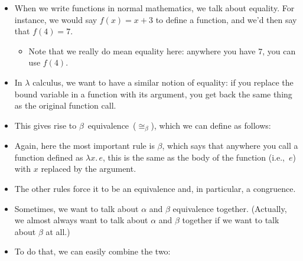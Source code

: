 \documentclass{lecturenotes}
\newcommand{\abs}[2]{\ensuremath{\lambda #1.\,#2}}
\newcommand{\app}[2]{\ensuremath{#1\;#2}}
\begin{document}
\begin{itemize}
\item When we write functions in normal mathematics, we talk about equality.
  For instance, we would say $f(x) = x + 3$ to define a function, and we'd then say that $f(4) = 7$.
  \begin{itemize}
  \item Note that we really do mean equality here: anywhere you have $7$, you can use $f(4)$.
  \end{itemize}
\item In $\lambda$ calculus, we want to have a similar notion of equality: if you replace the bound variable in a function with its argument, you get back the same thing as the original function call.
\item This gives rise to $\beta$~equivalence~($\cong_\beta$), which we can define as follows:
\item Again, here the most important rule is $\beta$, which says that anywhere you call a function defined as $\abs{x}{e}$, this is the same as the body of the function (i.e.,~$e$) with $x$ replaced by the argument.
\item The other rules force it to be an equivalence and, in particular, a congruence.
\item Sometimes, we want to talk about $\alpha$ and $\beta$ equivalence together.
  (Actually, we almost always want to talk about $\alpha$ and $\beta$ together if we want to talk about $\beta$ at all.)
\item To do that, we can easily combine the two:
\end{itemize}
\end{document}
